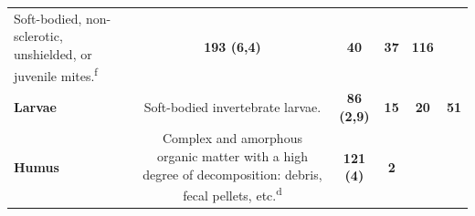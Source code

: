\documentclass[11pt]{article}
\begin{document}
\begin{longtable}[]{@{}lccccc@{}}
\begin{minipage}[t]{0.45\columnwidth}
Soft-bodied, non-sclerotic, unshielded, or juvenile
mites.\textsuperscript{f}\strut
\end{minipage} & \begin{minipage}[t]{0.14\columnwidth}\centering
\textbf{193 (6,4)}\strut
\end{minipage} & \begin{minipage}[t]{0.04\columnwidth}\centering
\textbf{40}\strut
\end{minipage} & \begin{minipage}[t]{0.04\columnwidth}\centering
\textbf{37}\strut
\end{minipage} & \begin{minipage}[t]{0.04\columnwidth}\centering
\textbf{116}\strut
\end{minipage}\tabularnewline
\begin{minipage}[t]{0.11\columnwidth}\raggedright
\textbf{Larvae}\strut
\end{minipage} & \begin{minipage}[t]{0.45\columnwidth}\centering
Soft-bodied invertebrate larvae.\strut
\end{minipage} & \begin{minipage}[t]{0.14\columnwidth}\centering
\textbf{86 (2,9)}\strut
\end{minipage} & \begin{minipage}[t]{0.04\columnwidth}\centering
\textbf{15}\strut
\end{minipage} & \begin{minipage}[t]{0.04\columnwidth}\centering
\textbf{20}\strut
\end{minipage} & \begin{minipage}[t]{0.04\columnwidth}\centering
\textbf{51}\strut
\end{minipage}\tabularnewline
\begin{minipage}[t]{0.11\columnwidth}\raggedright
\textbf{Humus}\strut
\end{minipage} & \begin{minipage}[t]{0.45\columnwidth}\centering
Complex and amorphous organic matter with a high degree of
decomposition: debris, fecal pellets, etc.\textsuperscript{d}\strut
\end{minipage} & \begin{minipage}[t]{0.14\columnwidth}\centering
\textbf{121 (4)}\strut
\end{minipage} & \begin{minipage}[t]{0.04\columnwidth}\centering
\textbf{2}\strut
\end{minipage} & \begin{minipage}[t]{0.04\columnwidth}\centering

\end{minipage}
\end{longtable}
\end{document}
